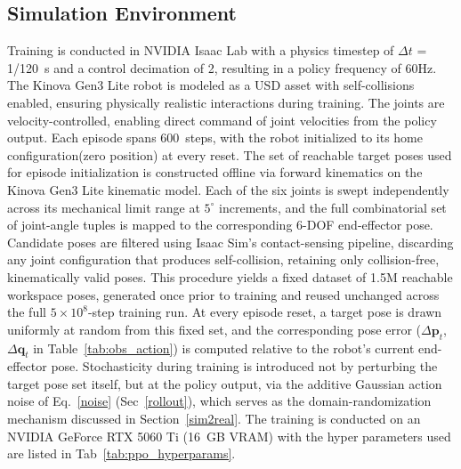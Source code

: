 \documentclass[preprint,12pt]{elsarticle}
\begin{document}
\subsection{Simulation Environment}
\label{simulation}
Training is conducted in NVIDIA Isaac Lab with a physics timestep of $\Delta t$ = 1/120~s and a control decimation of 2, resulting in a policy frequency of 60Hz. The Kinova Gen3 Lite robot is modeled as a USD asset with self-collisions enabled, ensuring physically realistic interactions during training. The joints are velocity-controlled, enabling direct command of joint velocities from the policy output. Each episode spans 600~steps, with the robot initialized to its home configuration(zero position) at every reset. The set of reachable target poses used for episode initialization is
constructed offline via forward kinematics on the Kinova Gen3 Lite
kinematic model. Each of the six joints is swept independently across its
mechanical limit range at $5^{\circ}$ increments, and the full combinatorial
set of joint-angle tuples is mapped to the corresponding 6-DOF end-effector
pose. Candidate poses are filtered using Isaac Sim's contact-sensing
pipeline, discarding any joint configuration that produces self-collision,
retaining only collision-free, kinematically valid poses. This procedure
yields a fixed dataset of 1.5M reachable workspace poses, generated once
prior to training and reused unchanged across the full $5\times10^{8}$-step
training run. At every episode reset, a target pose is drawn uniformly at
random from this fixed set, and the corresponding pose error
($\Delta\mathbf{p}_t$, $\Delta\mathbf{q}_t$ in Table~\ref{tab:obs_action})
is computed relative to the robot's current end-effector pose. Stochasticity
during training is introduced not by perturbing the target pose set itself,
but at the policy output, via the additive Gaussian action noise of
Eq.~\ref{noise} (Sec~\ref{rollout}), which serves as the
domain-randomization mechanism discussed in Section~\ref{sim2real}. The training is conducted on an NVIDIA GeForce RTX 5060 Ti (16~GB VRAM) with the hyper parameters used are listed in Tab~\ref{tab:ppo_hyperparams}.
\end{document}
